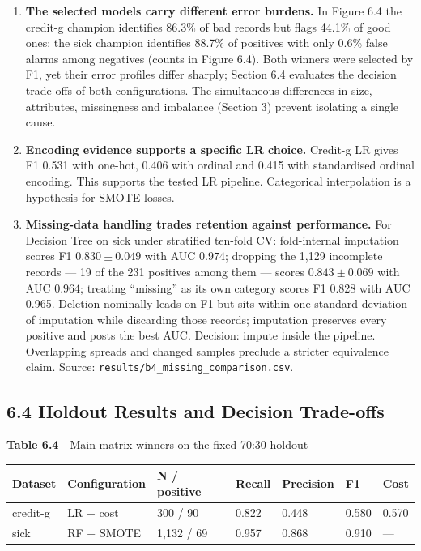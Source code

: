 \documentclass[12pt]{article}
\begin{document}
\begin{enumerate}
\item \textbf{The selected models carry different error burdens.} In Figure 6.4 the
credit-g champion identifies 86.3\% of bad records but flags 44.1\% of good ones;
the sick champion identifies 88.7\% of positives with only 0.6\% false alarms among
negatives (counts in Figure 6.4). Both winners were selected by F1, yet their error
profiles differ sharply; Section 6.4 evaluates the decision trade-offs of both
configurations. The simultaneous differences in size, attributes, missingness and
imbalance (Section 3) prevent isolating a single cause.
\item \textbf{Encoding evidence supports a specific LR choice.} Credit-g LR gives F1
0.531 with one-hot, 0.406 with ordinal and 0.415 with standardised ordinal encoding.
This supports the tested LR pipeline. Categorical interpolation is a hypothesis for
SMOTE losses.
\item \textbf{Missing-data handling trades retention against performance.} For
Decision Tree on sick under stratified ten-fold CV: fold-internal imputation scores
F1 $0.830 \pm 0.049$ with AUC $0.974$; dropping the 1,129 incomplete records ---
19 of the 231 positives among them --- scores $0.843 \pm 0.069$ with AUC $0.964$;
treating ``missing'' as its own category scores F1 0.828 with AUC 0.965. Deletion
nominally leads on F1 but sits within one standard deviation of imputation while
discarding those records; imputation preserves every positive and posts the best AUC.
Decision: impute inside the pipeline. Overlapping spreads and changed samples
preclude a stricter equivalence claim. Source:
\texttt{results/b4\_missing\_comparison.csv}.
\end{enumerate}

\subsection*{6.4 Holdout Results and Decision Trade-offs}

\begin{center}
\begin{minipage}{\textwidth}
\centering
{\footnotesize\textbf{Table 6.4}\ \ Main-matrix winners on the fixed 70:30 holdout}

\footnotesize
\begin{tabular}{p{0.75in}p{1.15in}p{0.9in}p{0.65in}p{0.8in}p{0.55in}p{0.55in}}
\toprule
Dataset & Configuration & N / positive & Recall & Precision & F1 & Cost \\
\midrule
credit-g & LR + cost & 300 / 90 & 0.822 & 0.448 & 0.580 & 0.570 \\
sick & RF + SMOTE & 1,132 / 69 & 0.957 & 0.868 & 0.910 & --- \\
\bottomrule
\end{tabular}
\end{minipage}
\end{center}
\end{document}
